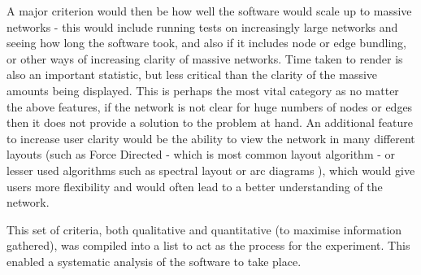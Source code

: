 \documentclass[../dissertation.tex]{subfiles}
\begin{document}
A major criterion would then be how well the software would scale up to massive networks - this would include running tests on increasingly large networks and seeing how long the software took, and also if it includes node or edge bundling, or other ways of increasing clarity of massive networks. Time taken to render is also an important statistic, but less critical than the clarity of the massive amounts being displayed. This is perhaps the most vital category as no matter the above features, if the network is not clear for huge numbers of nodes or edges then it does not provide a solution to the problem at hand. An additional feature to increase user clarity would be the ability to view the network in many different layouts (such as Force Directed \cite{fruchterman1991graph} - which is most common layout algorithm - or lesser used algorithms such as spectral layout \cite{beckman1994theory} or arc diagrams \cite{didimo2013graph}), which would give users more flexibility and would often lead to a better understanding of the network. 

This set of criteria, both qualitative and quantitative (to maximise information gathered), was compiled into a list to act as the process for the experiment. This enabled a systematic analysis of the software to take place.
\end{document}
